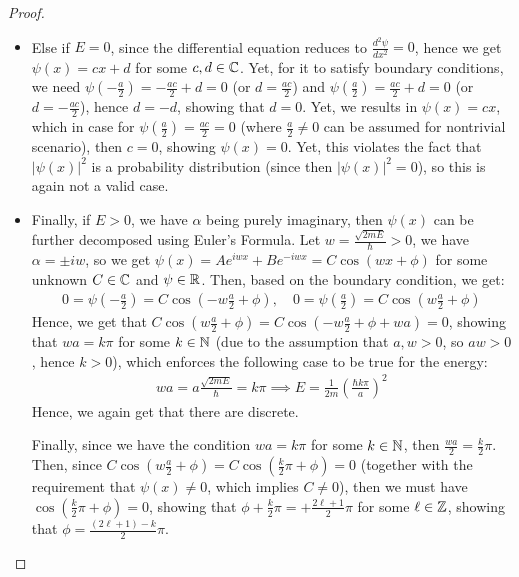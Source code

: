 \documentclass{article}
\begin{document}
\begin{proof}
\begin{itemize}
        \hfil

        \item Else if $E=0$, since the differential equation reduces to $\frac{d^2\psi}{dx^2}=0$, hence we get $\psi(x)=cx+d$ for some $c,d\in\mathbb{C}$. Yet, for it to satisfy boundary conditions, we need $\psi(-\frac{a}{2})=-\frac{ac}{2}+d=0$ (or $d=\frac{ac}{2}$) and $\psi(\frac{a}{2})=\frac{ac}{2}+d=0$ (or $d=-\frac{ac}{2}$), hence $d=-d$, showing that $d=0$. Yet, we results in $\psi(x)=cx$, which in case for $\psi(\frac{a}{2})=\frac{ac}{2}=0$ (where $\frac{a}{2}\neq 0$ can be assumed for nontrivial scenario), then $c=0$, showing $\psi(x)=0$. Yet, this violates the fact that $|\psi(x)|^2$ is a probability distribution (since then $|\psi(x)|^2=0$), so this is again not a valid case.
        
        \hfil

        \item Finally, if $E> 0$, we have $\alpha$ being purely imaginary, then $\psi(x)$ can be further decomposed using Euler's Formula. Let $w = \frac{\sqrt{2mE}}{\hbar}> 0$, we have $\alpha=\pm iw$, so we get $\psi(x)=Ae^{iw x}+Be^{-iw x} = C \cos(wx+\phi)$ for some unknown $C\in\mathbb{C}$ and $\psi\in\mathbb{R}$. Then, based on the boundary condition, we get:
        \begin{align}
            0=\psi\left(-\frac{a}{2}\right)=C\cos\left(-w\frac{a}{2}+\phi\right),\quad 0=\psi\left(\frac{a}{2}\right)=C\cos\left(w\frac{a}{2}+\phi\right)
        \end{align}
        Hence, we get that $C\cos\left(w\frac{a}{2}+\phi\right)=C\cos\left(-w\frac{a}{2}+\phi+wa\right)=0$, showing that $wa = k\pi$ for some $k\in\mathbb{N}$ (due to the assumption that $a,w>0$, so $aw>0$, hence $k>0$), which enforces the following case to be true for the energy:
        \begin{align}
            wa = a\frac{\sqrt{2mE}}{\hbar}=k\pi\implies E=\frac{1}{2m}\left(\frac{\hbar k\pi}{a}\right)^2
        \end{align}
        Hence, we again get that there are discrete.

        Finally, since we have the condition $wa=k\pi$ for some $k\in\mathbb{N}$, then $\frac{wa}{2}=\frac{k}{2}\pi$. Then, since $C\cos(w\frac{a}{2}+\phi)=C\cos(\frac{k}{2}\pi+\phi)=0$ (together with the requirement that $\psi(x)\neq 0$, which implies $C\neq 0$), then we must have $\cos(\frac{k}{2}\pi+\phi)=0$, showing that $\phi+\frac{k}{2}\pi = +\frac{2\ell+1}{2}\pi$ for some $\ell\in\mathbb{Z}$, showing that $\phi = \frac{(2\ell+1)-k}{2}\pi$.


\end{itemize}
\end{proof}
\end{document}
